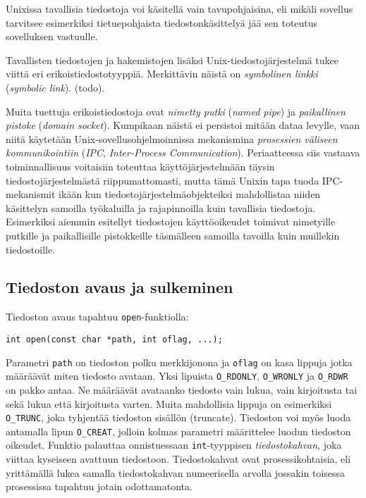 Unixissa tavallisia tiedostoja voi käsitellä vain tavupohjaisina,
eli mikäli sovellus tarvitsee esimerkiksi tietuepohjaista tiedostonkäsittelyä jää sen toteutus sovelluksen vastuulle.

Tavallisten tiedostojen ja hakemistojen lisäksi Unix-tiedostojärjestelmä tukee viittä eri erikoistiedostotyyppiä.
Merkittävin näistä on \emph{symbolinen linkki} (\emph{symbolic link}). (todo).

Muita tuettuja erikoistiedostoja ovat \emph{nimetty putki} (\emph{named pipe}) ja \emph{paikallinen pistoke} (\emph{domain socket}).
Kumpikaan näistä ei persistoi mitään dataa levylle,
vaan niitä käytetään Unix-sovellusohjelmoinnissa mekanismina \emph{prosessien väliseen kommunikointiin} (\emph{IPC}, \emph{Inter-Process Communication}).
Periaatteessa siis vastaava toiminnallisuus voitaisiin toteuttaa käyttöjärjestelmään täysin tiedostojärjestelmästä riippumattomasti,
mutta tämä Unixin tapa tuoda IPC-mekanismit ikään kun tiedostojärjestelmäobjekteiksi mahdollistaa niiden käsittelyn samoilla työkaluilla ja rajapinnoilla kuin tavallisia tiedostoja.
Esimerkiksi aiemmin esitellyt tiedostojen käyttöoikeudet toimivat nimetyille putkille ja paikallisille pistokkeille täsmälleen samoilla tavoilla kuin muillekin tiedostoille.

\subsection{Tiedoston avaus ja sulkeminen}
Tiedoston avaus tapahtuu \texttt{open}-funktiolla:

\begin{verbatim}
int open(const char *path, int oflag, ...);
\end{verbatim}

Parametri \texttt{path} on tiedoston polku merkkijonona
ja \texttt{oflag} on kasa lippuja jotka määräävät miten tiedosto avataan.
Yksi lipuista \texttt{O\_RDONLY}, \texttt{O\_WRONLY} ja \texttt{O\_RDWR} on pakko antaa.
Ne määräävät avataanko tiedosto vain lukua, vain kirjoitusta tai sekä lukua että
kirjoitusta varten.
Muita mahdollisia lippuja on esimerkiksi \texttt{O\_TRUNC},
joka tyhjentää tiedoston sisällön (truncate).
Tiedoston voi myös luoda antamalla lipun \texttt{O\_CREAT},
jolloin kolmas parametri määrittelee luodun tiedoston oikeudet.
Funktio palauttaa onnistuessaan \texttt{int}-tyyppisen \emph{tiedostokahvan},
joka viittaa kyseiseen avattuun tiedostoon.
Tiedostokahvat ovat prosessikohtaisia,
eli yrittämällä lukea samalla tiedostokahvan numeerisella arvolla
jossakin toisessa prosessissa tapahtuu jotain odottamatonta.


